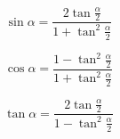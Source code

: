 \begin{equation}
\sin \alpha = \frac{2 \tan \frac{\alpha}{2}}{1+\tan^2 \frac{\alpha}{2}} \label{eq:trig1}
\end{equation}

\begin{equation}
\cos \alpha = \frac{1- \tan^2 \frac{\alpha}{2}}{1+\tan^2 \frac{\alpha}{2}} \label{eq:trig2}
\end{equation}

\begin{equation}
\tan \alpha = \frac{2 \tan \frac{\alpha}{2}}{1-\tan^2 \frac{\alpha}{2}} \label{eq:trig3}
\end{equation}